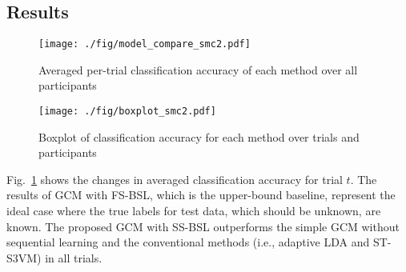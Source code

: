 \documentclass[letterpaper, 10 pt, conference]{ieeeconf}
\begin{document}
  
\subsection{Results}

\begin{figure}[t]
    \centering
      \texttt{[image: ./fig/model\_compare\_smc2.pdf]}
    \caption{Averaged per-trial classification accuracy of each method over all participants}
    \label{fig :model_accuracy}
\end{figure}

\begin{figure}[t]
    \centering
      \texttt{[image: ./fig/boxplot\_smc2.pdf]}
    \caption{Boxplot of classification accuracy for each method over trials and participants}
    \label{fig: boxplot}
\end{figure}

Fig.~\ref{fig :model_accuracy} shows the changes in averaged classification accuracy for trial $t$. 
The results of GCM with FS-BSL, which is the upper-bound baseline, represent the ideal case where the true labels for test data, which should be unknown, are known. 
The proposed GCM with SS-BSL outperforms the simple GCM  without sequential learning and the conventional methods (i.e., adaptive LDA and ST-S3VM) in all trials. 
\end{document}
